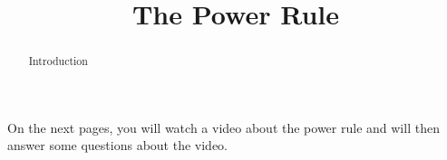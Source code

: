 \documentclass[handout]{ximera}
\title{The Power Rule}
\begin{document}
\begin{abstract} Introduction %
\end{abstract}


\maketitle

On the next pages, you will watch a video about the power rule and will then answer some questions about the video.
\end{document}
